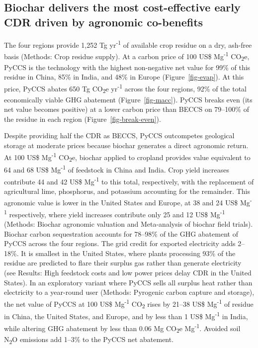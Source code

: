 \documentclass[
  letterpaper,
  twoside,
  twocolumn,
  9pt]{article}
\begin{document}
\subsection{Biochar delivers the most cost-effective early CDR driven by
agronomic
co-benefits}\label{biochar-delivers-the-most-cost-effective-early-cdr-driven-by-agronomic-co-benefits}

The four regions provide 1,252 Tg yr\textsuperscript{-1} of available
crop residue on a dry, ash-free basis (Methods: Crop residue supply). At
a carbon price of 100 US\$ Mg\textsuperscript{-1} CO\textsubscript{2}e,
PyCCS is the technology with the highest non-negative net value for 99\%
of this residue in China, 85\% in India, and 48\% in Europe
(Figure~\ref{fig-evap}). At this price, PyCCS abates 650 Tg
CO\textsubscript{2}e yr\textsuperscript{-1} across the four regions,
92\% of the total economically viable GHG abatement
(Figure~\ref{fig-macc}). PyCCS breaks even (its net value becomes
positive) at a lower carbon price than BECCS on 79--100\% of the residue
in each region (Figure~\ref{fig-break-even}).

Despite providing half the CDR as BECCS, PyCCS outcompetes geological
storage at moderate prices because biochar generates a direct agronomic
return. At 100 US\$ Mg\textsuperscript{-1} CO\textsubscript{2}e, biochar
applied to cropland provides value equivalent to 64 and 68 US\$
Mg\textsuperscript{-1} of feedstock in China and India. Crop yield
increases contribute 44 and 42 US\$ Mg\textsuperscript{-1} to this
total, respectively, with the replacement of agricultural lime,
phosphorus, and potassium accounting for the remainder. This agronomic
value is lower in the United States and Europe, at 38 and 24 US\$
Mg\textsuperscript{-1} respectively, where yield increases contribute
only 25 and 12 US\$ Mg\textsuperscript{-1} (Methods: Biochar agronomic
valuation and Meta-analysis of biochar field trials). Biochar carbon
sequestration accounts for 78--98\% of the GHG abatement of PyCCS across
the four regions. The grid credit for exported electricity adds 2--18\%.
It is smallest in the United States, where plants processing 93\% of the
residue are predicted to flare their surplus gas rather than generate
electricity (see Results: High feedstock costs and low power prices
delay CDR in the United States). In an exploratory variant where PyCCS
sells all surplus heat rather than electricity to a year-round user
(Methods: Pyrogenic carbon capture and storage), the net value of PyCCS
at 100 US\$ Mg\textsuperscript{-1} CO\textsubscript{2} rises by 21--38
US\$ Mg\textsuperscript{-1} of residue in China, the United States, and
Europe, and by less than 1 US\$ Mg\textsuperscript{-1} in India, while
altering GHG abatement by less than 0.06 Mg CO\textsubscript{2}e
Mg\textsuperscript{-1}. Avoided soil N\textsubscript{2}O emissions add
1--3\% to the PyCCS net abatement.
\end{document}
